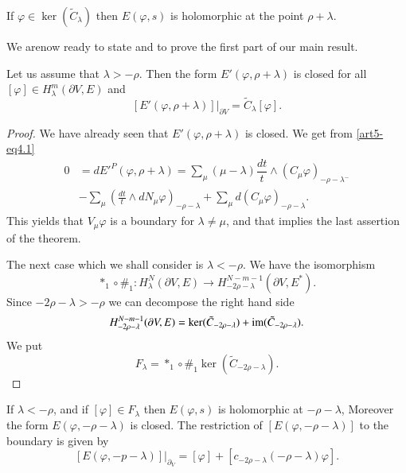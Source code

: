 \setcounter{lemma}{4}
\begin{lemma}\label{art5-eq4.5}
If $\varphi \in \ker (\tilde{C}_\lambda)$ then $E(\varphi, s)$ is holomorphic at the point $\rho + \lambda$.
\end{lemma}

We are\pageoriginale now ready to state and to prove the first part of our main result.

\setcounter{subsection}{6}
\begin{subtheorem}\label{art5-subthm4.6.1}
Let us assume that $\lambda > - \rho$. Then the form $E' (\varphi, \rho + \lambda)$ is closed for all $[\varphi] \in H^m_\lambda (\partial V, E)$ and 
$$
[E' (\varphi , \rho + \lambda)] |_{\partial V} = \tilde{C}_\lambda [\varphi].
$$
\end{subtheorem}

\begin{proof}
We have already seen that $E'(\varphi, \rho +\lambda)$ is closed. We get from \eqref{art5-eq4.1}
\begin{align*}
0  & = dE'^P (\varphi , \rho + \lambda) = \sum\limits_\mu (\mu - \lambda) \dfrac{dt}{t} \wedge (C_\mu \varphi)_{- \rho - \lambda^-}\\
& - \sum\limits_\mu \left(\frac{dt}{t} \wedge d N_{\mu} \varphi \right)_{-\rho - \lambda} + \sum\limits_\mu d (C_\mu \varphi)_{-\rho - \lambda}.
\end{align*}
This yields that $V_\mu \varphi$ is a boundary for $\lambda \neq \mu$, and that implies the last assertion of the theorem.

The next case which we shall consider is $\lambda < - \rho$. We have the isomorphism
$$
\ast_1 \circ \#_1: H^N_\lambda  (\partial V, E) \longrightarrow H^{N-m-1}_{-2\rho -\lambda} (\partial V, E^\ast).
$$
Since $-2 \rho - \lambda > -\rho$  we can decompose the right hand side 
$$
H^{N - m -1}_{-2 \rho -\lambda} (\partial V, E) = \ker (\tilde{C}_{-2\rho - \lambda}) + \operatorname{im} (\tilde{C}_{-2\rho -\lambda}).
$$
We put 
$$
F_\lambda = \ast_1 \circ \#_1 \ker (\tilde{C}_{-2\rho -\lambda}).
$$
\end{proof}

\begin{subtheorem}\label{art5-subthm4.6.2}
If $\lambda < - \rho$, and if $[\varphi] \in F_\lambda$ then $E(\varphi, s)$ is holomorphic at $- \rho -\lambda$, Moreover the form $E (\varphi, - \rho - \lambda)$ is closed. The restriction of $[E (\varphi, -\rho - \lambda)]$ to the boundary is given by
$$
[E(\varphi, - p - \lambda)] |_{\partial_V} = [\varphi] + [c_{-2\rho -\lambda} (-\rho - \lambda) \varphi].
$$
\end{subtheorem}

